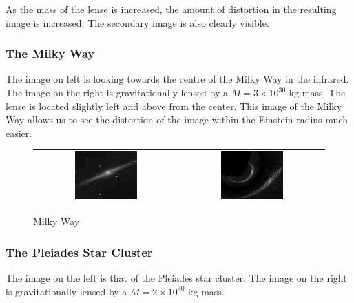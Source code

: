 \documentclass[a4paper]{IEEEtran}
\begin{document}
As the mass of the lense is increased, the amount of distortion in the
resulting image is increased. The secondary image is also clearly visible.

\subsubsection{The Milky Way}
The image on left is looking towards the centre of the Milky Way in the
infrared. The image on the right is gravitationally lensed by a 
$M = 3 \times 10^{30}$ kg mass. The lense is located slightly left and above
from the center. This image of the Milky Way allows us to see the distortion
of the image within the Einstein radius much easier.

\begin{figure}
    \caption{Milky Way} 
    \label{fig:milky-way} 
    \begin{center}
        \begin{tabular}{cc}
            \includegraphics[width=0.45\textwidth]{Pics/milky.eps} &
            \includegraphics[width=0.45\textwidth]{Pics/milky3e30.eps} 
        \end{tabular}
    \end{center}
\end{figure}

\subsubsection{The Pleiades Star Cluster}
The image on the left is that of the Pleiades star cluster. The image
on the right is gravitationally lensed by a $M = 2 \times 10^{30}$ kg
mass.
\end{document}
